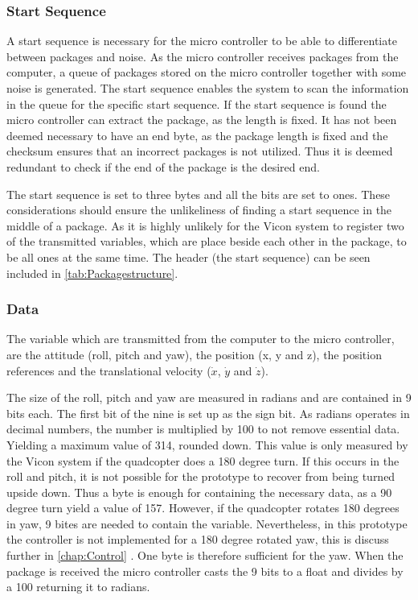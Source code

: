 \subsubsection{Start Sequence}
A start sequence is necessary for the micro controller to be able to differentiate between packages and noise. As the micro controller receives packages from the computer, a queue of packages stored on the micro controller together with some noise is generated. The start sequence enables the system to scan the information in the queue for the specific start sequence. If the start sequence is found the micro controller can extract the package, as the length is fixed. It has not been deemed necessary to have an end byte, as the package length is fixed and the checksum ensures that an incorrect packages is not utilized. Thus it is deemed redundant to check if the end of the package is the desired end.

The start sequence is set to three bytes and all the bits are set to ones. These considerations should ensure the unlikeliness of finding a start sequence in the middle of a package. As it is highly unlikely for the Vicon system to register two of the transmitted variables, which are place beside each other in the package, to be all ones at the same time. The header (the start sequence) can be seen included in \autoref{tab:Packagestructure}.

\subsubsection{Data}
The variable which are transmitted from the computer to the micro controller, are the attitude (roll, pitch and yaw), the position (x, y and z), the position references and the translational velocity ($\dot{x}$, $\dot{y}$ and $\dot{z}$).

The size of the roll, pitch and yaw are measured in radians and are contained in 9 bits each. The first bit of the nine is set up as the sign bit. As radians operates in decimal numbers, the number is multiplied by 100 to not remove essential data. Yielding a maximum value of 314, rounded down. This value is only measured by the Vicon system if the quadcopter does a 180 degree turn. If this occurs in the roll and pitch, it is not possible for the prototype to recover from being turned upside down. Thus a byte is enough for containing the necessary data, as a 90 degree turn yield a value of 157. However, if the quadcopter rotates 180 degrees in yaw, 9 bites are needed to contain the variable. Nevertheless, in this prototype the controller is not implemented for a 180 degree rotated yaw, this is discuss further in \autoref{chap:Control} . One byte is therefore sufficient for the yaw. When the package is received the micro controller casts the 9 bits to a float and divides by a 100 returning it to radians.

